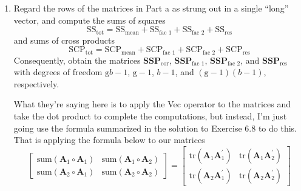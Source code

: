 \begin{enumerate}[label= (\alph*)]
    \item Regard the rows of the matrices in Part a as strung out in a single ``long'' vector, and
    compute the sums of squares
    \[
        \text{SS}_{\text{tot}}
        =
        \text{SS}_{\text{mean}}
        +
        \text{SS}_{\text{fac 1}}
        +
        \text{SS}_{\text{fac 2}}
        +
        \text{SS}_{\text{res}}
    \]
    and sums of cross products
    \[
        \text{SCP}_{\text{tot}}
        =
        \text{SCP}_{\text{mean}}
        +
        \text{SCP}_{\text{fac 1}}
        +
        \text{SCP}_{\text{fac 2}}
        +
        \text{SCP}_{\text{res}}
    \]
    Consequently, obtain the matrices $\textbf{SSP}_{\text{cor}}$,
    $\textbf{SSP}_{\text{fac 1}}$,
    $\textbf{SSP}_{\text{fac 2}}$,
    and \newline $\textbf{SSP}_{\text{res}}$
    with degrees of freedom $\text{g}b - 1$, $\text{g} - 1$, $b - 1$, and $(\text{g} - 1)(b - 1)$, respectively.

    What they're saying here is to apply the Vec operator to the matrices and take the dot product to complete the computations, but instead, I'm just going use the formula summarized in the solution to Exercise 6.8 to do this.
    That is applying the formula below to our matrices
    \[
        \left[
            \begin{array}{cc}
                \text{sum}(\textbf{A}_{1} \circ \textbf{A}_{1}) & \text{sum}(\textbf{A}_{1} \circ \textbf{A}_{2}) \\
                \text{sum}(\textbf{A}_{2} \circ \textbf{A}_{1}) & \text{sum}(\textbf{A}_{2} \circ \textbf{A}_{2})
            \end{array}
        \right]
        =
        \left[
            \begin{array}{cc}
                \text{tr}(\textbf{A}_{1} \textbf{A}_{1}^{\prime}) & \text{tr}(\textbf{A}_{1} \textbf{A}_{2}^{\prime}) \\
                \text{tr}(\textbf{A}_{2} \textbf{A}_{1}^{\prime}) & \text{tr}(\textbf{A}_{2} \textbf{A}_{2}^{\prime})
            \end{array}
        \right]
    \]


\end{enumerate}
